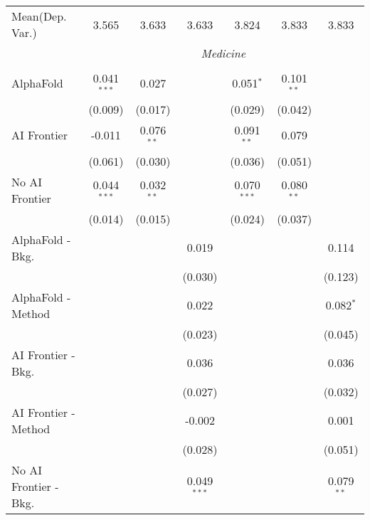 \begin{tabular}{lcccccc}
Mean(Dep. Var.) & 3.565 & 3.633 & 3.633 & 3.824 & 3.833 & 3.833 \\
 & \multicolumn{6}{c}{\textit{Medicine}} \\ \\
   AlphaFold               & 0.041$^{***}$ & 0.027        &               & 0.051$^{*}$   & 0.101$^{**}$ &   \\   
                           & (0.009)       & (0.017)      &               & (0.029)       & (0.042)      &   \\   
   AI Frontier             & -0.011        & 0.076$^{**}$ &               & 0.091$^{**}$  & 0.079        &   \\   
                           & (0.061)       & (0.030)      &               & (0.036)       & (0.051)      &   \\   
   No AI Frontier          & 0.044$^{***}$ & 0.032$^{**}$ &               & 0.070$^{***}$ & 0.080$^{**}$ &   \\   
                           & (0.014)       & (0.015)      &               & (0.024)       & (0.037)      &   \\   
   AlphaFold - Bkg.        &               &              & 0.019         &               &              & 0.114\\   
                           &               &              & (0.030)       &               &              & (0.123)\\   
   AlphaFold - Method      &               &              & 0.022         &               &              & 0.082$^{*}$\\   
                           &               &              & (0.023)       &               &              & (0.045)\\   
   AI Frontier - Bkg.      &               &              & 0.036         &               &              & 0.036\\   
                           &               &              & (0.027)       &               &              & (0.032)\\   
   AI Frontier - Method    &               &              & -0.002        &               &              & 0.001\\   
                           &               &              & (0.028)       &               &              & (0.051)\\   
   No AI Frontier - Bkg.   &               &              & 0.049$^{***}$ &               &              & 0.079$^{**}$\\   

\end{tabular}
